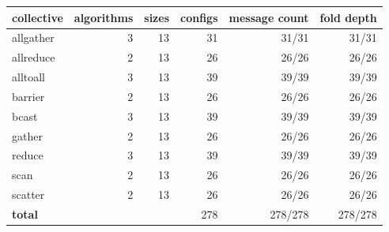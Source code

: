 \begin{tabular}{lrrrrr}
\toprule
collective & algorithms & sizes & configs & message count & fold depth \\
\midrule
allgather & 3 & 13 & 31 & 31/31 & 31/31 \\
allreduce & 2 & 13 & 26 & 26/26 & 26/26 \\
alltoall & 3 & 13 & 39 & 39/39 & 39/39 \\
barrier & 2 & 13 & 26 & 26/26 & 26/26 \\
bcast & 3 & 13 & 39 & 39/39 & 39/39 \\
gather & 2 & 13 & 26 & 26/26 & 26/26 \\
reduce & 3 & 13 & 39 & 39/39 & 39/39 \\
scan & 2 & 13 & 26 & 26/26 & 26/26 \\
scatter & 2 & 13 & 26 & 26/26 & 26/26 \\
\midrule
\textbf{total} & & & 278 & 278/278 & 278/278 \\
\bottomrule
\end{tabular}
